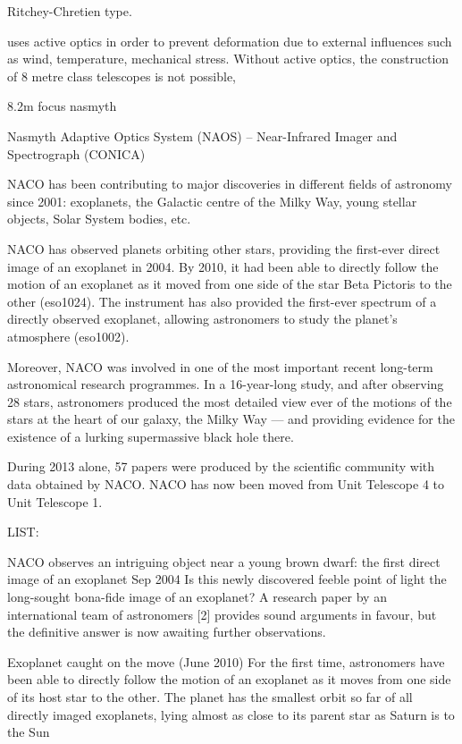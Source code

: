 \documentclass[12pt,a4paper]{article}  %
\begin{document}
Ritchey-Chretien type.

uses active optics in order to prevent deformation due to external influences such as wind, temperature, mechanical stress. Without active optics, the construction of 8 metre class telescopes is not possible,



 8.2m focus nasmyth

Nasmyth Adaptive Optics System (NAOS) – Near-Infrared Imager and Spectrograph (CONICA)

NACO has been contributing to major discoveries in different fields of astronomy since 2001: exoplanets, the Galactic centre of the Milky Way, young stellar objects, Solar System bodies, etc.

NACO has observed planets orbiting other stars, providing the first-ever direct image of an exoplanet in 2004. By 2010, it had been able to directly follow the motion of an exoplanet as it moved from one side of the star Beta Pictoris to the other (eso1024). The instrument has also provided the first-ever spectrum of a directly observed exoplanet, allowing astronomers to study the planet’s atmosphere (eso1002).

Moreover, NACO was involved in one of the most important recent long-term astronomical research programmes. In a 16-year-long study, and after observing 28 stars, astronomers produced the most detailed view ever of the motions of the stars at the heart of our galaxy, the Milky Way — and providing evidence for the existence of a lurking supermassive black hole there.

During 2013 alone, 57 papers were produced by the scientific community with data obtained by NACO. NACO has now been moved from Unit Telescope 4 to Unit Telescope 1.

LIST:

NACO observes an intriguing object near a young brown dwarf: the first direct image of an exoplanet Sep 2004
Is this newly discovered feeble point of light the long-sought bona-fide image of an exoplanet? A research paper by an international team of astronomers [2] provides sound arguments in favour, but the definitive answer is now awaiting further observations.


Exoplanet caught on the move (June 2010)
For the first time, astronomers have been able to directly follow the motion of an exoplanet as it moves from one side of its host star to the other. The planet has the smallest orbit so far of all directly imaged exoplanets, lying almost as close to its parent star as Saturn is to the Sun
\end{document}

